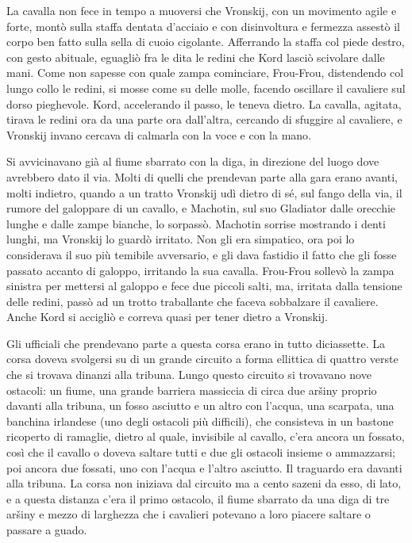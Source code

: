 La cavalla non fece in tempo a muoversi che Vronskij, con un movimento agile e forte, montò sulla staffa dentata d'acciaio e con disinvoltura e fermezza assestò il corpo ben fatto sulla sella di cuoio cigolante. Afferrando la staffa col piede destro, con gesto abituale, eguagliò fra le dita le redini che Kord lasciò scivolare dalle mani. Come non sapesse con quale zampa cominciare, Frou-Frou, distendendo col lungo collo le redini, si mosse come su delle molle, facendo oscillare il cavaliere sul dorso pieghevole. Kord, accelerando il passo, le teneva dietro. La cavalla, agitata, tirava le redini ora da una parte ora dall'altra, cercando di sfuggire al cavaliere, e Vronskij invano cercava di calmarla con la voce e con la mano. 

Si avvicinavano già al fiume sbarrato con la diga, in direzione del luogo dove avrebbero dato il via. Molti di quelli che prendevan parte alla gara erano avanti, molti indietro, quando a un tratto Vronskij udì dietro di sé, sul fango della via, il rumore del galoppare di un cavallo, e Machotin, sul suo Gladiator dalle orecchie lunghe e dalle zampe bianche, lo sorpassò. Machotin sorrise mostrando i denti lunghi, ma Vronskij lo guardò irritato. Non gli era simpatico, ora poi lo considerava il suo più temibile avversario, e gli dava fastidio il fatto che gli fosse passato accanto di galoppo, irritando la sua cavalla. Frou-Frou sollevò la zampa sinistra per mettersi al galoppo e fece due piccoli salti, ma, irritata dalla tensione delle redini, passò ad un trotto traballante che faceva sobbalzare il cavaliere. Anche Kord si accigliò e correva quasi per tener dietro a Vronskij. 

Gli ufficiali che prendevano parte a questa corsa erano in tutto diciassette. La corsa doveva svolgersi su di un grande circuito a forma ellittica di quattro verste che si trovava dinanzi alla tribuna. Lungo questo circuito si trovavano nove ostacoli: un fiume, una grande barriera massiccia di circa due aršiny proprio davanti alla tribuna, un fosso asciutto e un altro con l'acqua, una scarpata, una banchina irlandese (uno degli ostacoli più difficili), che consisteva in un bastone ricoperto di ramaglie, dietro al quale, invisibile al cavallo, c'era ancora un fossato, così che il cavallo o doveva saltare tutti e due gli ostacoli insieme o ammazzarsi; poi ancora due fossati, uno con l'acqua e l'altro asciutto. Il traguardo era davanti alla tribuna. La corsa non iniziava dal circuito ma a cento sazeni da esso, di lato, e a questa distanza c'era il primo ostacolo, il fiume sbarrato da una diga di tre aršiny e mezzo di larghezza che i cavalieri potevano a loro piacere saltare o passare a guado. 

